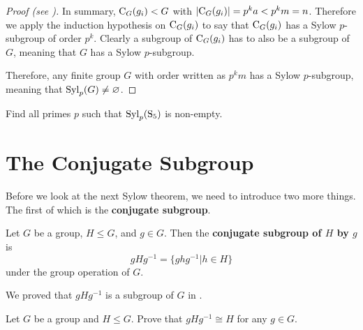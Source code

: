 \begin{proof}[Proof (see {\cite[pp.~1--3]{mann_2011}})]
    In summary, $\mathrm{C}_{G}(g_i) < G$ with $|\mathrm{C}_{G}(g_i)| = p^ka < p^km = n$. Therefore we apply the induction hypothesis on $\mathrm{C}_{G}(g_i)$ to say that $\mathrm{C}_{G}(g_i)$ has a Sylow $p$-subgroup of order $p^k$. Clearly a subgroup of $\mathrm{C}_{G}(g_i)$ has to also be a subgroup of $G$, meaning that $G$ has a Sylow $p$-subgroup.

    Therefore, any finite group $G$ with order written as $p^k m$ has a Sylow $p$-subgroup, meaning that $\mathrm{Syl}_{p}(G) \neq \varnothing$.
\end{proof}

\begin{exercise}
    Find all primes $p$ such that $\mathrm{Syl}_{p}(\mathrm{S}_{5})$ is non-empty.
\end{exercise}

\newpage

\section{The Conjugate Subgroup}
Before we look at the next Sylow theorem, we need to introduce two more things. The first of which is the \textbf{conjugate subgroup}.
\begin{definition}
    Let $G$ be a group, $H \leq G$, and $g \in G$. Then the \textbf{conjugate subgroup of $H$ by $g$} is
    \[
        gHg^{-1} = \{ghg^{-1} \vert h \in H\}
    \]
    under the group operation of $G$.
\end{definition}
We proved that $gHg^{-1}$ is a subgroup of $G$ in .

\begin{exercise}\label{exercise-conjugate-subgroup-isomorphic-to-subgroup}
    Let $G$ be a group and $H \leq G$. Prove that $gHg^{-1} \cong H$ for any $g \in G$.
\end{exercise}

